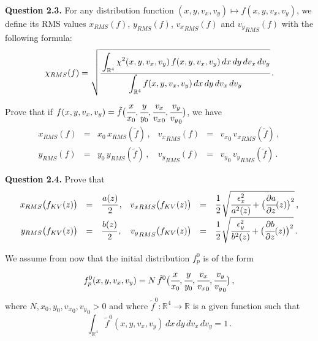\documentclass[10pt]{article}
\newcommand{\R}{{\mathbb R}}
\newcommand{\D}{{\partial}}
\begin{document}
\begin{leftbar}
\textbf{Question 2.3.} For any distribution function $(x,y,v_{x},v_{y}) \mapsto f(x,y,v_{x},v_{y})$, we define its RMS values $x_{RMS}(f)$, $y_{RMS}(f)$, ${v_{x}}_{RMS}(f)$ and ${v_{y}}_{RMS}(f)$ with the following formula:
\begin{equation}
\chi_{RMS}(f) = \sqrt{\cfrac{\displaystyle \int_{\R^{4}} \chi^{2}(x,y,v_{x},v_{y})\, f(x,y,v_{x},v_{y})\, dx\, dy\,dv_{x}\, dv_{y}}{\displaystyle \int_{\R^{4}} f(x,y,v_{x},v_{y})\, dx\, dy\,dv_{x}\, dv_{y}}} \, .
\end{equation}
Prove that if $f(x,y,v_{x},v_{y}) = \tilde{f}\big(\cfrac{x}{x_{0}},\cfrac{y}{y_{0}},\cfrac{v_{x}}{{v_{x}}_{0}}, \cfrac{v_{y}}{{v_{y}}_{0}}\big)$, we have
\begin{equation}
\begin{array}{rclrcl}
x_{RMS}(f) &=& x_{0}\,x_{RMS}(\tilde{f}) \, , & {v_{x}}_{RMS}(f) &=& {v_{x}}_{0}\,{v_{x}}_{RMS}(\tilde{f}) \, , \\
y_{RMS}(f) &=& y_{0}\,y_{RMS}(\tilde{f}) \, , & {v_{y}}_{RMS}(f) &=& {v_{y}}_{0}\,{v_{y}}_{RMS}(\tilde{f}) \, .
\end{array}
\end{equation}
\end{leftbar}


\begin{leftbar}
\textbf{Question 2.4.} Prove that 
\begin{equation}
\begin{array}{rclrcl}
x_{RMS}\big(f_{KV}(z)\big) &=& \cfrac{a(z)}{2} \, , & {v_{x}}_{RMS}\big(f_{KV}(z)\big) &=& \cfrac{1}{2}\,\sqrt{\cfrac{\epsilon_{x}^{2}}{a^{2}(z)}+\big(\cfrac{\D a}{\D z}(z)\big)^{2}} \, , \\ y_{RMS}\big(f_{KV}(z)\big) &=& \cfrac{b(z)}{2} \, , & {v_{y}}_{RMS}\big(f_{KV}(z)\big) &=& \cfrac{1}{2}\,\sqrt{\cfrac{\epsilon_{y}^{2}}{b^{2}(z)}+\big(\cfrac{\D b}{\D z}(z)\big)^{2}} \, .
\end{array}
\end{equation}
\end{leftbar}


We assume from now that the initial distribution $f_{p}^{0}$ is of the form
\begin{equation} \label{rescaled_f0}
f_{p}^{0}(x,y,v_{x},v_{y}) = N\,\tilde{f}^{0}\big( \cfrac{x}{x_{0}}, \cfrac{y}{y_{0}}, \cfrac{v_{x}}{{v_{x}}_{0}}, \cfrac{v_{y}}{{v_{y}}_{0}} \big) \, ,
\end{equation}
where $N,x_{0},y_{0},{v_{x}}_{0},{v_{y}}_{0} > 0$ and where $\tilde{f}^{0} : \R^{4} \to \R$ is a given function such that
\begin{equation} \label{sum1}
\int_{\R^{4}} \tilde{f}^{0}(x,y,v_{x},v_{y})\, dx \, dy \, dv_{x} \, dv_{y} = 1 \, .
\end{equation}
\end{document}
